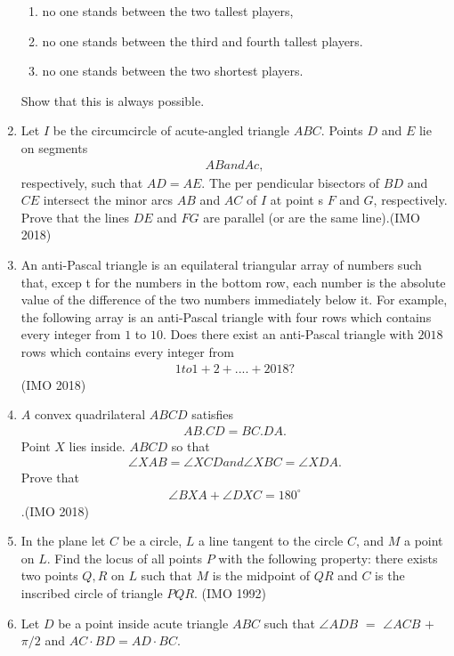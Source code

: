 \begin{enumerate}
\begin{enumerate}[label=(\arabic *)]
		\item no one stands between the two tallest players,        
\item no one stands between the third and fourth tallest players.                                               \item no one stands between the two shortest players.                                                             \end{enumerate}                         
	Show that this is always possible.
\item Let $I$ be the circumcircle of acute-angled triangle $ABC$. Points $D$ and $E$     lie on segments \begin{align}AB and Ac,\end{align} respectively, such that $AD=AE$. The per    pendicular bisectors of $BD$ and $CE$ intersect the minor arcs $AB$ and $AC$ of $I$ at point    s $F$ and $G$, respectively. Prove that the lines $DE$ and $FG$ are parallel (or are the same line).\hfill (IMO 2018)
\item An anti-Pascal triangle is an equilateral triangular array of numbers such that, excep    t for the numbers in the bottom row, each number is the absolute value of the difference of the two numbers immediately below it. For example, the following array is an anti-Pascal triangle with four rows which contains every integer from $1$ to $10$.
	Does there exist an anti-Pascal triangle with $2018$ rows which contains every integer from \begin{align}1 to 1+2 +....+2018?\end{align} \hfill (IMO 2018)
		\item $A$ convex quadrilateral $ABCD$ satisfies \begin{align}AB.CD=BC.DA.\end{align} Point $X$ lies inside. $ABCD$ so that \begin{align}\angle XAB=\angle XCD and \angle XBC=\angle XDA.    \end{align} Prove that\begin{align}\angle BXA+\angle DXC=180^\circ\end{align}.\hfill (IMO 2018)
\item In the plane let $C$ be a circle, $L$ a line  tangent to the circle $C$, and $M$ a point on $L$. Find the locus of all points $P$ with the following property: there exists two points $Q,R$ on $L$ such that $M$ is the midpoint of $QR$ and $C$ is the inscribed circle of triangle $PQR$.  \hfill(IMO 1992)
\item Let $D$ be a point inside acute triangle $ABC$ such that $\angle ADB$ $=$ $\angle ACB$ $+$ $\pi/2$ and $AC \cdot BD = AD \cdot BC$.
 

\end{enumerate}
